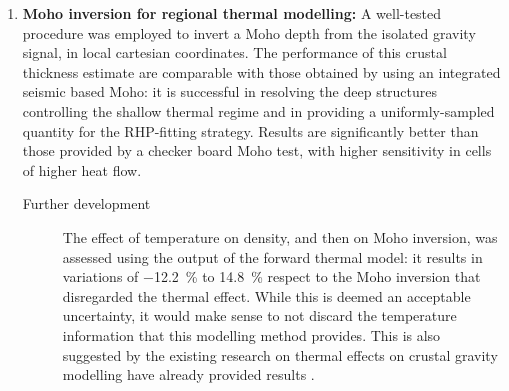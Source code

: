\begin{enumerate}
    \item \textsf{\textbf{Moho inversion for regional thermal modelling:}}
    A well-tested procedure was employed to invert a Moho depth from the isolated gravity signal, in local cartesian coordinates.
    The performance of this crustal thickness estimate are comparable with those obtained by using an integrated seismic based Moho: it is successful in resolving the deep structures controlling the shallow thermal regime and in providing a uniformly-sampled quantity for the RHP-fitting strategy.
    Results are significantly better than those provided by a checker board Moho test, with higher sensitivity in cells of higher heat flow.
    \begin{description}
        \item[\quad Further development] The effect of temperature on density, and then on Moho inversion, was assessed using the output of the forward thermal model: it results in variations of \SI{-12.2}{\percent} to \SI[retain-explicit-plus]{+14.8}{\percent} respect to the Moho inversion that disregarded the thermal effect. While this is deemed an acceptable uncertainty, it would make sense to not discard the temperature information that this modelling method provides. This is also suggested by the existing research on thermal effects on crustal gravity modelling have already provided  results \parencite[e.g.][]{Bagherbandi2017thermal}.
    \end{description}


\end{enumerate}
